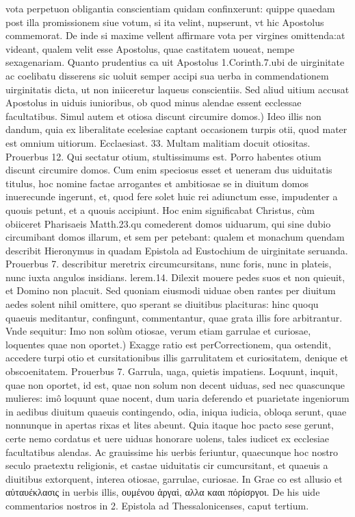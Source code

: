 \documentclass{article}
\begin{document}
\begin{pages}
\marginpar{[ p.111 ]}\pstart vota perpetuon obligantia conscientiam quidam confinxerunt: quippe quaedam post illa promissionem siue votum, si ita velint, nupserunt, vt hic Apostolus commemorat. De inde si maxime vellent affirmare vota per virgines omittenda:at videant, qualem velit esse Apostolus, quae castitatem uoueat, nempe sexagenariam. Quanto prudentius ca uit Apostolus 1.Corinth.7.ubi de uirginitate ac coelibatu disserens sic uoluit semper accipi sua uerba in commendationem uirginitatis dicta, ut non iniiceretur laqueus conscientiis. Sed aliud uitium accusat Apostolus in uiduis iunioribus, ob quod minus alendae essent ecclessae facultatibus.  \pend\pstart Simul autem et otiosa discunt circumire domos.) Ideo illis non dandum, quia ex liberalitate ecelesiae captant occasionem turpis otii, quod mater est omnium uitiorum. Ecclaesiast. 33. Multam malitiam docuit otiositas. Prouerbus 12. Qui sectatur otium, stultissimums est. Porro habentes otium discunt circumire domos. Cum enim speciosus esset et ueneram dus uiduitatis titulus, hoc nomine factae arrogantes et ambitiosae se in diuitum domos inuerecunde ingerunt, et, quod fere solet huic rei adiunctum esse, impudenter a quouis petunt, et a quouis accipiunt. Hoc enim significabat Christus, cùm obiiceret Pharisaeis Matth.23.qu comederent domos uiduarum, qui sine dubio circumibant domos illarum, et sem per petebant: qualem et monachum quendam describit Hieronymus in quadam Epistola ad Eustochium de uirginitate seruanda. Prouerbus 7. describitur meretrix circumcursitans, nunc foris, nunc in plateis, nunc iuxta angulos insidians. lerem.14. Dilexit mouere pedes suos et non quieuit, et Domino non placuit. Sed quoniam eiusmodi uiduae oben rantes per diuitum aedes solent nihil omittere, quo sperant se diuitibus placituras: hinc quoqu quaeuis meditantur, confingunt, commentantur, quae grata illis fore arbitrantur. Vnde sequitur:  \pend\pstart Imo non solùm otiosae, verum etiam garrulae et curiosae, loquentes quae non oportet.) Exagge ratio est perCorrectionem, qua ostendit, accedere turpi otio et cursitationibus illis garrulitatem et curiositatem, denique et obscoenitatem. Prouerbus 7. Garrula, uaga, quietis impatiens. Loquunt, inquit, quae non oportet, id est, quae non solum non decent uiduas, sed nec quascunque  mulieres: imô loquunt quae nocent, dum uaria deferendo et puarietate ingeniorum in aedibus  diuitum quaeuis contingendo, odia, iniqua iudicia, obloqa serunt, quae nonnunque in apertas rixas et lites abeunt. Quia itaque hoc pacto sese gerunt, certe nemo cordatus et uere uiduas honorare uolens, tales iudicet ex ecclesiae facultatibus alendas. Ac grauissime his uerbis feriuntur, quaecunque hoc nostro seculo praetextu religionis, et castae uiduitatis cir cumcursitant, et quaeuis a diuitibus extorquent, interea otiosae, garrulae, curiosae. In Grae co est allusio et αὐταυέκλασις in uerbis illis, ουμένου ἀργαὶ, αλλα κααι πόρίσργοι. De his uide commentarios nostros in 2. Epistola ad Thessalonicenses, caput tertium.  \pend
{}
{}

\end{pages}
\end{document}
